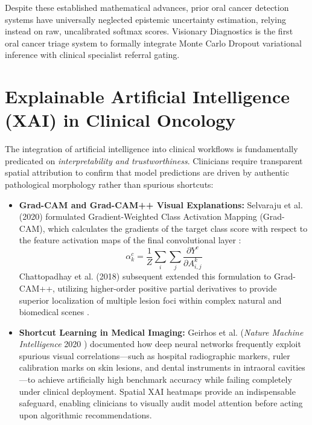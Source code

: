 \documentclass[12pt,a4paper,oneside]{report}
\begin{document}
Despite these established mathematical advances, prior oral cancer detection systems have universally neglected epistemic uncertainty estimation, relying instead on raw, uncalibrated softmax scores. Visionary Diagnostics is the first oral cancer triage system to formally integrate Monte Carlo Dropout variational inference with clinical specialist referral gating.

\section{Explainable Artificial Intelligence (XAI) in Clinical Oncology}
\label{sec:xai_lit}

The integration of artificial intelligence into clinical workflows is fundamentally predicated on \textit{interpretability and trustworthiness}. Clinicians require transparent spatial attribution to confirm that model predictions are driven by authentic pathological morphology rather than spurious shortcuts:

\begin{itemize}
    \item \textbf{Grad-CAM and Grad-CAM++ Visual Explanations:} Selvaraju et al. (2020) formulated Gradient-Weighted Class Activation Mapping (Grad-CAM), which calculates the gradients of the target class score with respect to the feature activation maps of the final convolutional layer \cite{selvaraju2020gradcam}:
    \begin{equation}
        \alpha_k^c = \frac{1}{Z} \sum_{i} \sum_{j} \frac{\partial Y^c}{\partial A_{i,j}^k}
    \end{equation}
    Chattopadhay et al. (2018) subsequent extended this formulation to Grad-CAM++, utilizing higher-order positive partial derivatives to provide superior localization of multiple lesion foci within complex natural and biomedical scenes \cite{chattopadhay2018gradcampp}.
    
    \item \textbf{Shortcut Learning in Medical Imaging:} Geirhos et al. (\textit{Nature Machine Intelligence} 2020 \cite{geirhos2020shortcut}) documented how deep neural networks frequently exploit spurious visual correlations---such as hospital radiographic markers, ruler calibration marks on skin lesions, and dental instruments in intraoral cavities---to achieve artificially high benchmark accuracy while failing completely under clinical deployment. Spatial XAI heatmaps provide an indispensable safeguard, enabling clinicians to visually audit model attention before acting upon algorithmic recommendations.
\end{itemize}
\end{document}
